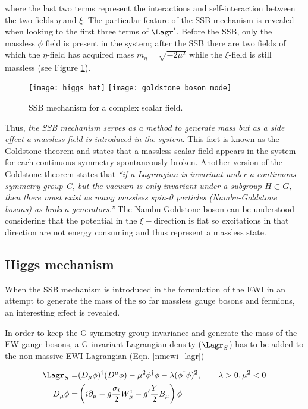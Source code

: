 \noindent where the last two terms represent the interactions and self-interaction between the two fields $\eta$ and $\xi$. The particular feature of the SSB mechanism is revealed when looking to the first three  terms of $\Lagr'$. Before the SSB, only the massless $\phi$ field is present in the system; after the SSB there are two fields of which the $\eta$-field has acquired mass $m_\eta=\sqrt{-2\mu^2}$ while the $\xi$-field is still massless (see Figure \ref{higgs_hat}). 

\begin{figure}[!h]
\centering
\texttt{[image: higgs\_hat]}
\texttt{[image: goldstone\_boson\_mode]}
\caption[SSB mechanism for complex scalar field]{SSB mechanism for a complex scalar field\cite{broken_symmetry,endres}.}
\label{higgs_hat}
\end{figure}

Thus, \textit {the SSB mechanism serves as a method to generate mass but as a side effect a massless field is introduced in the system}. This fact is known as the Goldstone theorem and states that a massless scalar field appears in the system for each continuous symmetry spontaneously broken. Another version of the Goldstone theorem states that \textit{``if a Lagrangian is invariant under a continuous symmetry group G, but the vacuum is only invariant under a subgroup $H\subset G$, then there must exist as many massless spin-0 particles (Nambu-Goldstone bosons) as broken generators.''}\cite{pich} The Nambu-Goldstone boson can be understood considering that the potential in the ${\xi-\textrm{direction}}$ is flat so excitations in that direction are not energy consuming and thus represent a massless state.                   

\subsection{Higgs mechanism}

When the SSB mechanism is introduced in the formulation of the EWI in an attempt to generate the mass of the so far massless gauge bosons and fermions, an interesting effect is revealed.

In order to keep the G symmetry group invariance and generate the mass of the EW gauge bosons, a G invariant Lagrangian density ($\Lagr_S$) has to be added to the non massive EWI Lagrangian (Eqn. \ref{nmewi_lagr})

\begin{align}
\Lagr_S    = &(D_\mu\phi)^\dagger(D^\mu\phi) - \mu^2\phi^\dagger\phi - \lambda(\phi^\dagger\phi)^2 , \qquad \lambda>0, \mu^2<0 \label{ls}\\
D_\mu\phi = &\left(i\partial_\mu - g\frac{\sigma_i}{2}W^i_\mu -
g'\frac{Y}{2}B_\mu\right)\phi
\end{align}

